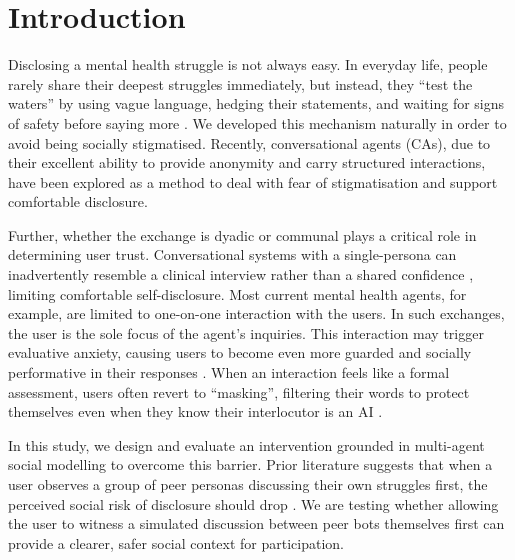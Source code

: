 \documentclass[sigconf]{acmart}
\begin{document}



\maketitle

\section{Introduction}
Disclosing a mental health struggle is not always easy. In everyday life, people rarely share their deepest struggles immediately, but instead, they ``test the waters'' by using vague language, hedging their statements, and waiting for signs of safety before saying more \cite{Ammari2026RedditInfertility, Saha2019LGBTQ}. 
We developed this mechanism naturally in order to avoid being socially stigmatised. Recently, conversational agents (CAs), due to their excellent ability to provide anonymity and carry structured interactions, have been explored as a method to deal with fear of stigmatisation and support comfortable disclosure. 

Further, whether the exchange is dyadic or communal plays a critical role in determining user trust. Conversational systems with a single-persona can inadvertently resemble a clinical interview rather than a shared confidence \cite{Lee2023SocialContact, Song2025Cooperation}, limiting comfortable self-disclosure. Most current mental health agents, for example, are limited to one-on-one interaction with the users. In such exchanges, the user is the sole focus of the agent's inquiries. This interaction may trigger evaluative anxiety, causing users to become even more guarded and socially performative in their responses \cite{Cui2024ChatbotStigma}. When an interaction feels like a formal assessment, users often revert to ``masking'', filtering their words to protect themselves even when they know their interlocutor is an AI \cite{Meng2026CHALET}.

In this study, we design and evaluate an intervention grounded in multi-agent social modelling to overcome this barrier. Prior literature suggests that when a user observes a group of peer personas discussing their own struggles first, the perceived social risk of disclosure should drop \cite{Sien2025DigitalHumanLibrary}. We are testing whether allowing the user to witness a simulated discussion between peer bots themselves first can provide a clearer, safer social context for participation.
\end{document}
